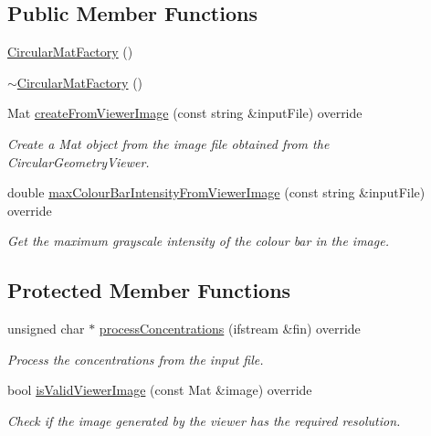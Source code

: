 \subsection*{Public Member Functions}
\begin{DoxyCompactItemize}
\item 
\hyperlink{classmultiscale_1_1analysis_1_1CircularMatFactory_a9b4523850ed5fbf84f27d10a93a48f80}{Circular\-Mat\-Factory} ()
\item 
\hyperlink{classmultiscale_1_1analysis_1_1CircularMatFactory_aaf49d7ad7e1955709929d180686e99d8}{$\sim$\-Circular\-Mat\-Factory} ()
\item 
Mat \hyperlink{classmultiscale_1_1analysis_1_1CircularMatFactory_a8d5fccf946065b982bfa700b9e47b1f5}{create\-From\-Viewer\-Image} (const string \&input\-File) override
\begin{DoxyCompactList}\small\item\em Create a Mat object from the image file obtained from the Circular\-Geometry\-Viewer. \end{DoxyCompactList}\item 
double \hyperlink{classmultiscale_1_1analysis_1_1CircularMatFactory_aea41720f6adfb983bb94ea0a45789874}{max\-Colour\-Bar\-Intensity\-From\-Viewer\-Image} (const string \&input\-File) override
\begin{DoxyCompactList}\small\item\em Get the maximum grayscale intensity of the colour bar in the image. \end{DoxyCompactList}\end{DoxyCompactItemize}
\subsection*{Protected Member Functions}
\begin{DoxyCompactItemize}
\item 
unsigned char $\ast$ \hyperlink{classmultiscale_1_1analysis_1_1CircularMatFactory_a8fe40d38b896f440e17b5514462d1e8a}{process\-Concentrations} (ifstream \&fin) override
\begin{DoxyCompactList}\small\item\em Process the concentrations from the input file. \end{DoxyCompactList}\item 
bool \hyperlink{classmultiscale_1_1analysis_1_1CircularMatFactory_a08e407b35a2d314c1aa17f21040ff23a}{is\-Valid\-Viewer\-Image} (const Mat \&image) override
\begin{DoxyCompactList}\small\item\em Check if the image generated by the viewer has the required resolution. \end{DoxyCompactList}\end{DoxyCompactItemize}
